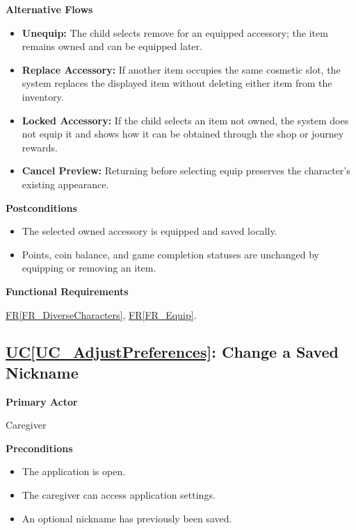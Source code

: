 \documentclass[12pt]{article}
\newcounter{ucnum} %
\newcommand{\ucref}[1]{\hyperref[#1]{UC\ref*{#1}}}
\newcommand{\rref}[1]{\hyperref[#1]{FR\ref*{#1}}}
\begin{document}
\textbf{Alternative Flows}
\begin{itemize}
    \item \textbf{Unequip:} The child selects remove for an equipped
    accessory; the item remains owned and can be equipped later.
    \item \textbf{Replace Accessory:} If another item occupies the
    same cosmetic slot, the system replaces the displayed item
    without deleting either item from the inventory.
    \item \textbf{Locked Accessory:} If the child selects an item not
    owned, the system does not equip it and shows how it can be
    obtained through the shop or journey rewards.
    \item \textbf{Cancel Preview:} Returning before selecting equip
    preserves the character's existing appearance.
\end{itemize}

\textbf{Postconditions}
\begin{itemize}
    \item The selected owned accessory is equipped and saved locally.
    \item Points, coin balance, and game completion statuses
    are unchanged by equipping or removing an item.
\end{itemize}

\textbf{Functional Requirements}

\rref{FR_DiverseCharacters}, \rref{FR_Equip}.

\label{UC_AdjustPreferences}
\subsection{\ucref{UC_AdjustPreferences}: Change a Saved Nickname}

\textbf{Primary Actor}

Caregiver

\textbf{Preconditions}
\begin{itemize}
    \item The application is open.
    \item The caregiver can access application settings.
    \item An optional nickname has previously been saved.
\end{itemize}
\end{document}
